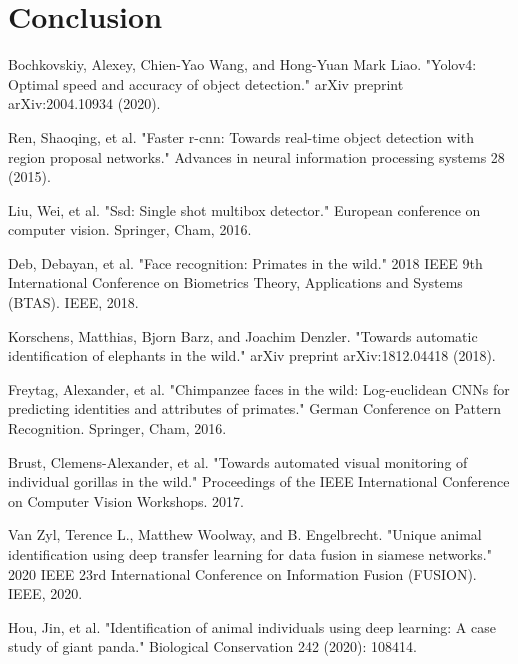 \documentclass[10pt,twocolumn,letterpaper]{article}
\begin{document}


\section{Conclusion}
\label{sec:conclusion}








\begin{thebibliography}{99}

	Bochkovskiy, Alexey, Chien-Yao Wang, and Hong-Yuan Mark Liao. "Yolov4: Optimal speed and accuracy of object detection." arXiv preprint arXiv:2004.10934 (2020).
	
	Ren, Shaoqing, et al. "Faster r-cnn: Towards real-time object detection with region proposal networks." Advances in neural information processing systems 28 (2015).
	

	Liu, Wei, et al. "Ssd: Single shot multibox detector." European conference on computer vision. Springer, Cham, 2016.


	Deb, Debayan, et al. "Face recognition: Primates in the wild." 2018 IEEE 9th International Conference on Biometrics Theory, Applications and Systems (BTAS). IEEE, 2018. 


	Korschens, Matthias, Bjorn Barz, and Joachim Denzler. "Towards automatic identification of elephants in the wild." arXiv preprint arXiv:1812.04418 (2018). 


	Freytag, Alexander, et al. "Chimpanzee faces in the wild: Log-euclidean CNNs for predicting identities and attributes of primates." German Conference on Pattern Recognition. Springer, Cham, 2016. 


	Brust, Clemens-Alexander, et al. "Towards automated visual monitoring of individual gorillas in the wild." Proceedings of the IEEE International Conference on Computer Vision Workshops. 2017. 


	Van Zyl, Terence L., Matthew Woolway, and B. Engelbrecht. "Unique animal identification using deep transfer learning for data fusion in siamese networks." 2020 IEEE 23rd International Conference on Information Fusion (FUSION). IEEE, 2020. 


	Hou, Jin, et al. "Identification of animal individuals using deep learning: A case study of giant panda." Biological Conservation 242 (2020): 108414. 



\end{thebibliography}
\end{document}

